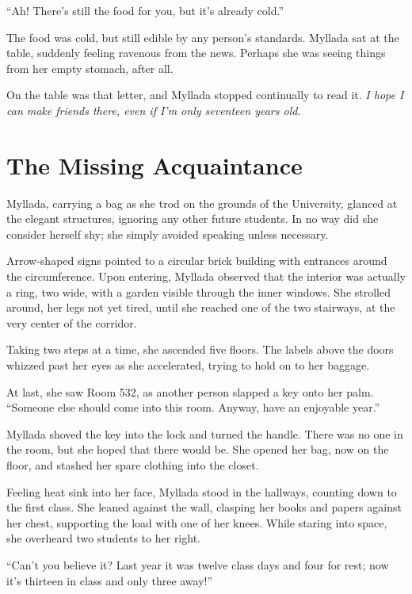``Ah! There's still the food for you, but it's already cold.''

The food was cold, but still edible by any person's standards. Myllada sat at the table, suddenly feeling ravenous from the news. Perhaps she was seeing things from her empty stomach, after all.

On the table was that letter, and Myllada stopped continually to read it. \emph{I hope I can make friends there, even if I'm only seventeen years old.}

\chapter{The Missing Acquaintance}

Myllada, carrying a bag as she trod on the grounds of the University, glanced at the elegant structures, ignoring any other future students. In no way did she consider herself shy; she simply avoided speaking unless necessary.

Arrow-shaped signs pointed to a circular brick building with entrances around the circumference. Upon entering, Myllada observed that the interior was actually a ring, two \vetyr wide, with a garden visible through the inner windows. She strolled around, her legs not yet tired, until she reached one of the two stairways, at the very center of the corridor.

Taking two steps at a time, she ascended five floors. The labels above the doors whizzed past her eyes as she accelerated, trying to hold on to her baggage.

At last, she saw Room 532, as another person slapped a key onto her palm. ``Someone else should come into this room. Anyway, have an enjoyable year.''

Myllada shoved the key into the lock and turned the handle. There was no one in the room, but she hoped that there would be. She opened her bag, now on the floor, and stashed her spare clothing into the closet.

\centeredstars

Feeling heat sink into her face, Myllada stood in the hallways, counting down to the first class. She leaned against the wall, clasping her books and papers against her chest, supporting the load with one of her knees. While staring into space, she overheard two students to her right.

``Can't you believe it? Last year it was twelve class days and four for rest; now it's thirteen in class and only three away!''


